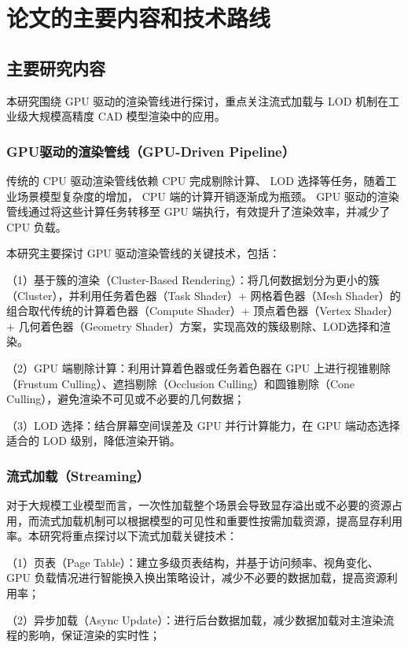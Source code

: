 \section{论文的主要内容和技术路线}

\subsection{主要研究内容}

本研究围绕 GPU 驱动的渲染管线进行探讨，重点关注流式加载与 LOD 机制在工业级大规模高精度 CAD 模型渲染中的应用。

\subsubsection{GPU驱动的渲染管线（GPU-Driven Pipeline）}

传统的 CPU 驱动渲染管线依赖 CPU 完成剔除计算、 LOD 选择等任务，随着工业场景模型复杂度的增加， CPU 端的计算开销逐渐成为瓶颈。 GPU 驱动的渲染管线通过将这些计算任务转移至 GPU 端执行，有效提升了渲染效率，并减少了 CPU 负载。

本研究主要探讨 GPU 驱动渲染管线的关键技术，包括：

（1）基于簇的渲染（Cluster-Based Rendering）：将几何数据划分为更小的簇（Cluster），并利用任务着色器（Task Shader）+ 网格着色器（Mesh Shader）的组合取代传统的计算着色器（Compute Shader）+ 顶点着色器（Vertex Shader） + 几何着色器（Geometry Shader）方案，实现高效的簇级剔除、LOD选择和渲染\cite{Czubala2024}。

（2）GPU 端剔除计算：利用计算着色器或任务着色器在 GPU 上进行视锥剔除（Frustum Culling）、遮挡剔除（Occlusion Culling）和圆锥剔除（Cone Culling），避免渲染不可见或不必要的几何数据；

（3）LOD 选择：结合屏幕空间误差及 GPU 并行计算能力，在 GPU 端动态选择适合的 LOD 级别，降低渲染开销。

\subsubsection{流式加载（Streaming）}

对于大规模工业模型而言，一次性加载整个场景会导致显存溢出或不必要的资源占用，而流式加载机制可以根据模型的可见性和重要性按需加载资源，提高显存利用率。本研究将重点探讨以下流式加载关键技术：

（1）页表（Page Table）：建立多级页表结构，并基于访问频率、视角变化、 GPU 负载情况进行智能换入换出策略设计，减少不必要的数据加载，提高资源利用率；

（2）异步加载（Async Update）：进行后台数据加载，减少数据加载对主渲染流程的影响，保证渲染的实时性；

